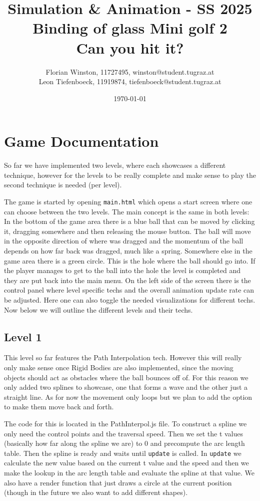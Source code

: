 \documentclass{article}
\title{	
	\large Simulation \& Animation - SS 2025\\
	\Huge{Binding of glass Mini golf 2}\\
	\huge{Can you hit it?}
}
\author{\parbox{\textwidth}{\centering
	Florian Winston, 11727495, winston@student.tugraz.at\\%
	Leon Tiefenboeck, 11919874, tiefenboeck@student.tugraz.at\\%
}}
\date{\today}
\begin{document}
\maketitle

\section{Game Documentation}

So far we have implemented two levels, where each showcases 
a different technique, however for the levels to be really complete and make sense to play the 
second technique is needed (per level). 

The game is started by opening \texttt{main.html} which opens a 
start screen where one can choose between the two levels. 
The main concept is the same in both levels: 
In the bottom of the game area there is a blue ball that can be moved 
by clicking it, dragging somewhere and then releasing the mouse button. 
The ball will move in the opposite direction of where was dragged and the momentum of the 
ball depends on how far back was dragged, much like a spring. 
Somewhere else in the game area there is a green circle. This is the hole where 
the ball should go into. If the player manages to get to the ball into the hole the level is completed 
and they are put back into the main menu. 
On the left side of the screen there is the control panel where level specific techs 
and the overall animation update rate can be adjusted. Here one can also toggle the needed visualizations 
for different techs. Now below we will outline the different levels and their techs. 

\subsection{Level 1}

This level so far features the Path Interpolation tech. However this will really only make sense 
once Rigid Bodies are also implemented, since the moving objects should act as obstacles where the 
ball bounces off of. For this reason we only added two splines to showcase, one that forms a wave and the other
just a straight line. As for now the movement only loops but we plan to add the option to 
make them move back and forth. 

The code for this is located in the PathInterpol.js file. To construct a spline we only need the control points and 
the traversal speed. Then we set the t values (basically how far along the spline we are) to $0$ and 
precompute the arc length table. Then the spline is ready and waits until \texttt{update} is called. 
In \texttt{update} we calculate the new value based on the current t value and the speed and then we make the 
lookup in the arc length table and evaluate the spline at that value. We also have a render function 
that just draws a circle at the current position (though in the future we also want to add different shapes).
\end{document}
